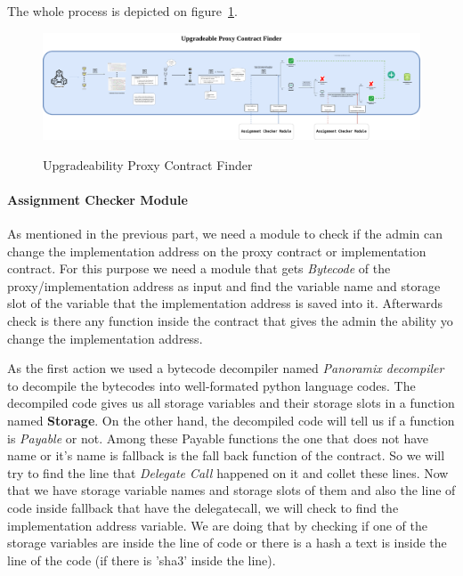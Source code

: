 The whole process is depicted on figure~\ref{fig:finderModule}.

\begin{figure}[t]
  \includegraphics[width=1.2\textwidth]{figures/Finder_module.png}\label{fig:finderModule}
  \caption{Upgradeability Proxy Contract Finder}
\end{figure}

\paragraph{Assignment Checker Module}

As mentioned in the previous part, we need a module to check if the admin can change the implementation address on the proxy contract or implementation contract. For this purpose we need a module that gets \textit{{Bytecode}} of the proxy/implementation address as input and find the variable name and storage slot of the variable that the implementation address is saved into it. Afterwards check is there any function inside the contract that gives the admin the ability yo change the implementation address.

As the first action we used a bytecode decompiler named \textit{Panoramix decompiler} to decompile the bytecodes into well-formated python language codes. The decompiled code gives us all storage variables and their storage slots in a function named \textbf{Storage}. On the other hand, the decompiled code will tell us if a function is \textit{Payable} or not. Among these Payable functions the one that does not have name or it's name is fallback is the fall back function of the contract. So we will try to find the line that \textit{Delegate Call} happened on it and collet these lines. Now that we have storage variable names and storage slots of them and also the line of code inside fallback that have the delegatecall, we will check to find the implementation address variable. We are doing that by checking if one of the storage variables are inside the line of code or there is a hash a text is inside the line of the code (if there is 'sha3' inside the line). 

